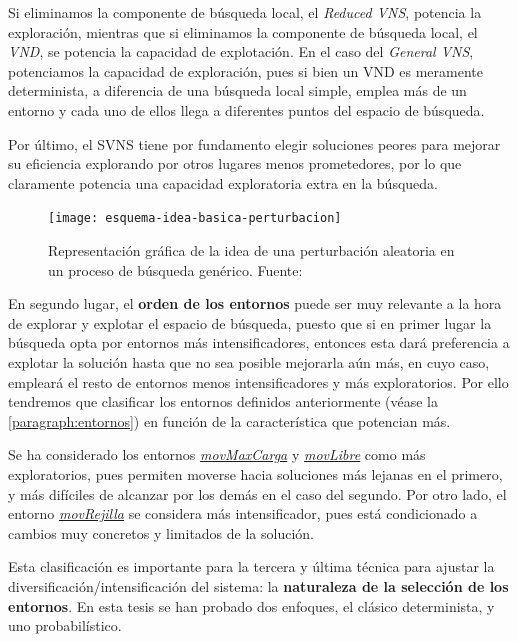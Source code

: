 Si eliminamos la componente de búsqueda local, el \textit{Reduced VNS}, potencia la exploración, mientras que si eliminamos la componente de búsqueda local, el \textit{VND}, se potencia la capacidad de explotación.
En el caso del \textit{General VNS}, potenciamos la capacidad de exploración, pues si bien un VND es meramente determinista, a diferencia de una búsqueda local simple, emplea más de un entorno y cada uno de ellos llega a diferentes puntos del espacio de búsqueda.

Por último, el SVNS tiene por fundamento elegir soluciones peores para mejorar su eficiencia explorando por otros lugares menos prometedores, por lo que claramente potencia una capacidad exploratoria extra en la búsqueda.

\begin{figure}
    \centering    \texttt{[image: esquema-idea-basica-perturbacion]}
    \caption[Representación gráfica de la idea de una perturbación aleatoria en un proceso de búsqueda genérico]{Representación gráfica de la idea de una perturbación aleatoria en un proceso de búsqueda genérico. Fuente:~\cite{sota:metaheuristicas-design-impl}}
    \label{fig:esquema-idea-basica-perturbacion}
\end{figure}

En segundo lugar, el \textbf{orden de los entornos} puede ser muy relevante a la hora de explorar y explotar el espacio de búsqueda, puesto que si en primer lugar la búsqueda opta por entornos más intensificadores, entonces esta dará preferencia a explotar la solución hasta que no sea posible mejorarla aún más, en cuyo caso, empleará el resto de entornos menos intensificadores y más exploratorios. Por ello tendremos que clasificar los entornos definidos anteriormente (véase la \autoref{paragraph:entornos}) en función de la característica que potencian más.

Se ha considerado los entornos \hyperref[entorno:movMaxCarga]{\textit{movMaxCarga}} y \hyperref[entorno:movLibre]{\textit{movLibre}} como más exploratorios, pues permiten moverse hacia soluciones más lejanas en el primero, y más difíciles de alcanzar por los demás en el caso del segundo. Por otro lado, el entorno \hyperref[entorno:movRejilla]{\textit{movRejilla}} se considera más intensificador, pues está condicionado a cambios muy concretos y limitados de la solución.

Esta clasificación es importante para la tercera y última técnica para ajustar la diversificación/intensificación del sistema: la \textbf{naturaleza de la selección de los entornos}. En esta tesis se han probado dos enfoques, el clásico determinista, y uno probabilístico.

